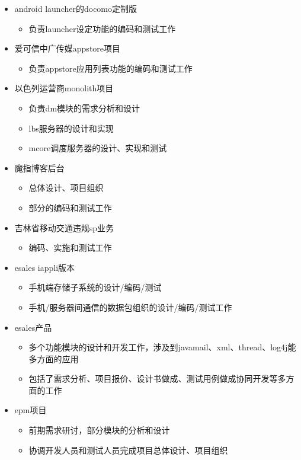 \begin{itemize}
  \item android launcher的docomo定制版
  \begin{itemize}
    \item 负责launcher设定功能的编码和测试工作
  \end{itemize}
  \item 爱可信中广传媒appstore项目
  \begin{itemize}
    \item 负责appstore应用列表功能的编码和测试工作
  \end{itemize}
  \item 以色列运营商monolith项目
  \begin{itemize}
    \item 负责dm模块的需求分析和设计
    \item lbs服务器的设计和实现
    \item mcore调度服务器的设计、实现和测试
  \end{itemize}
\end{itemize}

\begin{itemize}
  \item 魔指博客后台
  \begin{itemize}
    \item 总体设计、项目组织
    \item 部分的编码和测试工作
  \end{itemize}
  \item 吉林省移动交通违规sp业务
  \begin{itemize}
    \item 编码、实施和测试工作
  \end{itemize}
\end{itemize}

\begin{itemize}
  \item esales iappli版本
  \begin{itemize}
    \item 手机端存储子系统的设计/编码/测试
    \item 手机/服务器间通信的数据包组织的设计/编码/测试工作
  \end{itemize}
  \item esales产品
  \begin{itemize}
    \item 多个功能模块的设计和开发工作，涉及到javamail、xml、thread、log4j能多方面的应用
    \item 包括了需求分析、项目报价、设计书做成、测试用例做成协同开发等多方面的工作
  \end{itemize}
  \item epm项目
  \begin{itemize}
    \item 前期需求研讨，部分模块的分析和设计
    \item 协调开发人员和测试人员完成项目总体设计、项目组织
  \end{itemize}
\end{itemize}

